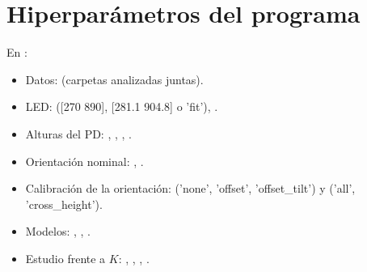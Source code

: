 \documentclass[11pt,a4paper]{article}
\begin{document}
\section{Hiperparámetros del programa}
En :
\begin{itemize}\small
\item Datos:  (carpetas analizadas juntas).
\item LED:  ([270 890], [281.1 904.8] o 'fit'), .
\item Alturas del PD: , , , .
\item Orientación nominal: , .
\item Calibración de la orientación:  ('none', 'offset', 'offset\_tilt') y  ('all', 'cross\_height').
\item Modelos: , , .
\item Estudio frente a $K$: , , , .
\end{itemize}
\end{document}
